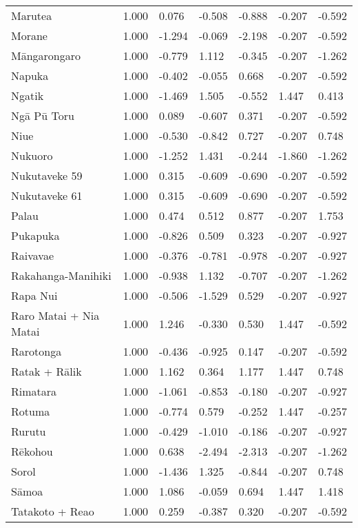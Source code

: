 \begin{longtable}{p{4.5cm}p{1.7cm}p{1.7cm}p{1.7cm}p{1.7cm}p{1.7cm}p{1.7cm}}
  Marutea & 1.000 & 0.076 & -0.508 & -0.888 & -0.207 & -0.592 \\ 
  Morane & 1.000 & -1.294 & -0.069 & -2.198 & -0.207 & -0.592 \\ 
  Māngarongaro & 1.000 & -0.779 & 1.112 & -0.345 & -0.207 & -1.262 \\ 
  Napuka & 1.000 & -0.402 & -0.055 & 0.668 & -0.207 & -0.592 \\ 
  Ngatik & 1.000 & -1.469 & 1.505 & -0.552 & 1.447 & 0.413 \\ 
  Ngā Pū Toru & 1.000 & 0.089 & -0.607 & 0.371 & -0.207 & -0.592 \\ 
  Niue & 1.000 & -0.530 & -0.842 & 0.727 & -0.207 & 0.748 \\ 
  Nukuoro & 1.000 & -1.252 & 1.431 & -0.244 & -1.860 & -1.262 \\ 
  Nukutaveke 59 & 1.000 & 0.315 & -0.609 & -0.690 & -0.207 & -0.592 \\ 
  Nukutaveke 61 & 1.000 & 0.315 & -0.609 & -0.690 & -0.207 & -0.592 \\ 
  Palau & 1.000 & 0.474 & 0.512 & 0.877 & -0.207 & 1.753 \\ 
  Pukapuka & 1.000 & -0.826 & 0.509 & 0.323 & -0.207 & -0.927 \\ 
  Raivavae & 1.000 & -0.376 & -0.781 & -0.978 & -0.207 & -0.927 \\ 
  Rakahanga-Manihiki & 1.000 & -0.938 & 1.132 & -0.707 & -0.207 & -1.262 \\ 
  Rapa Nui & 1.000 & -0.506 & -1.529 & 0.529 & -0.207 & -0.927 \\ 
  Raro Matai + Nia Matai & 1.000 & 1.246 & -0.330 & 0.530 & 1.447 & -0.592 \\ 
  Rarotonga & 1.000 & -0.436 & -0.925 & 0.147 & -0.207 & -0.592 \\ 
  Ratak + Rālik & 1.000 & 1.162 & 0.364 & 1.177 & 1.447 & 0.748 \\ 
  Rimatara & 1.000 & -1.061 & -0.853 & -0.180 & -0.207 & -0.927 \\ 
  Rotuma & 1.000 & -0.774 & 0.579 & -0.252 & 1.447 & -0.257 \\ 
  Rurutu & 1.000 & -0.429 & -1.010 & -0.186 & -0.207 & -0.927 \\ 
  Rēkohou & 1.000 & 0.638 & -2.494 & -2.313 & -0.207 & -1.262 \\ 
  Sorol & 1.000 & -1.436 & 1.325 & -0.844 & -0.207 & 0.748 \\ 
  Sāmoa & 1.000 & 1.086 & -0.059 & 0.694 & 1.447 & 1.418 \\ 
  Tatakoto + Reao & 1.000 & 0.259 & -0.387 & 0.320 & -0.207 & -0.592 \\ 

\end{longtable}

